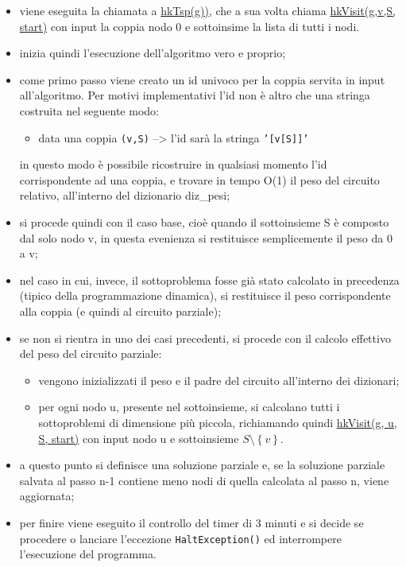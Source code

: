 \begin{itemize}
    \item viene eseguita la chiamata a \hyperlink{hktsp}{hkTsp(g))}, che a sua volta chiama \hyperlink{hkvisit}{hkVisit(g,v,S, start)} con input la coppia nodo 0 e sottoinsime la lista di tutti i nodi.
    
    \item inizia quindi l'esecuzione dell'algoritmo vero e proprio;
    
    \item come primo passo viene creato un id univoco per la coppia servita in input all'algoritmo. Per motivi implementativi l'id non è altro che una stringa costruita nel seguente modo:
    
    \begin{itemize}
        \item data una coppia \texttt{(v,S)} --> l'id sarà la stringa \texttt{'[v[S]]'}
    \end{itemize}
    
    in questo modo è possibile ricostruire in qualsiasi momento l'id corrispondente ad una coppia, e trovare in tempo O(1) il peso del circuito relativo, all'interno del dizionario diz\_pesi;
    
    \item si procede quindi con il caso base, cioè quando il sottoinsieme S è composto dal solo nodo v, in questa evenienza si restituisce semplicemente il peso da 0 a v;
    
    \item nel caso in cui, invece, il sottoproblema fosse già stato calcolato in precedenza (tipico della programmazione dinamica), si restituisce il peso corrispondente alla coppia (e quindi al circuito parziale);
    
    \item se non si rientra in uno dei casi precedenti, si procede con il calcolo effettivo del peso del circuito parziale:
    
    \begin{itemize}
        \item vengono inizializzati il peso e il padre del circuito all'interno dei dizionari;
        
        \item per ogni nodo u, presente nel sottoinsieme, si calcolano tutti i sottoproblemi di dimensione più piccola, richiamando quindi \hyperlink{hkvisit}{hkVisit(g, u, S, start)} con input nodo u e sottoinsieme \( S\setminus \left \{ v \right \} \).
        
    \end{itemize}
    
    \item a questo punto si definisce una soluzione parziale e, se la soluzione parziale salvata al passo n-1 contiene meno nodi di quella calcolata al passo n, viene aggiornata;
    
    \item per finire viene eseguito il controllo del timer di 3 minuti e si decide se procedere o lanciare l'eccezione \texttt{HaltException()} ed interrompere l'esecuzione del programma.
    
\end{itemize}

\newpage